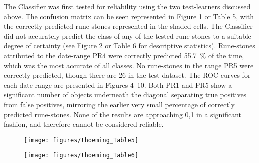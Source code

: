 
The Classifier was first tested for reliability using the two test-learners discussed above. The confusion matrix can be seen represented in Figure \ref{fig:Table5} or Table 5, with the correctly predicted rune-stones represented in the shaded cells. The Classifier did not accurately predict the class of any of the tested rune-stones to a suitable degree of certainty (see Figure \ref{fig:Table6} or Table 6 for descriptive statistics). Rune-stones attributed to the date-range PR4 were correctly predicted \SI{55.7}{\percent} of the time, which was the most accurate of all classes. No rune-stones in the range PR5 were correctly predicted, though there are \num{26} in the test dataset. 
The ROC curves for each date-range are presented in Figures 4--10. Both PR1 and PR5 show a significant number of objects underneath the diagonal separating true positives from false positives, mirroring the earlier very small percentage of correctly predicted rune-stones. None of the results are approaching 0,1 in a significant fashion, and therefore cannot be considered reliable.

\begin{figure}[!htb]
	\texttt{[image: figures/thoeming\_Table5]}
	\centering
	\label{fig:Table5}
\end{figure}

\begin{figure}[!htb]
	\texttt{[image: figures/thoeming\_Table6]}
	\centering
	\label{fig:Table6}
\end{figure}

